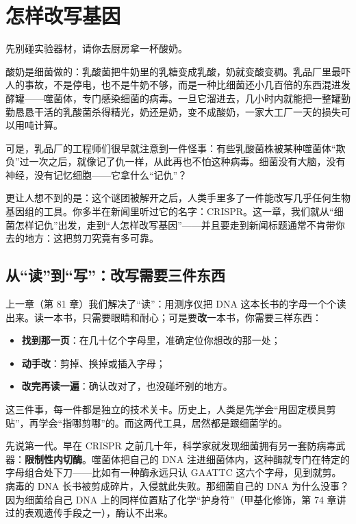 \chapter{怎样改写基因}

\begin{kaichang}
先别碰实验器材，请你去厨房拿一杯酸奶。

酸奶是细菌做的：乳酸菌把牛奶里的乳糖变成乳酸，奶就变酸变稠。乳品厂里最吓人的事故，不是停电，也不是牛奶不够，而是一种比细菌还小几百倍的东西混进发酵罐——噬菌体，专门感染细菌的病毒。一旦它溜进去，几小时内就能把一整罐勤勤恳恳干活的乳酸菌杀得精光，奶还是奶，变不成酸奶，一家大工厂一天的损失可以用吨计算。

可是，乳品厂的工程师们很早就注意到一件怪事：有些乳酸菌株被某种噬菌体“欺负”过一次之后，就像记了仇一样，从此再也不怕这种病毒。细菌没有大脑，没有神经，没有记忆细胞——它拿什么“记仇”？

更让人想不到的是：这个谜团被解开之后，人类手里多了一件能改写几乎任何生物基因组的工具。你多半在新闻里听过它的名字：CRISPR。这一章，我们就从“细菌怎样记仇”出发，走到“人怎样改写基因”——并且要走到新闻标题通常不肯带你去的地方：这把剪刀究竟有多可靠。
\end{kaichang}

\section{从“读”到“写”：改写需要三件东西}

上一章（第 81 章）我们解决了“读”：用测序仪把 DNA 这本长书的字母一个个读出来。读一本书，只需要眼睛和耐心；可是要\textbf{改}一本书，你需要三样东西：

\begin{itemize}[itemsep=2pt]
\item \textbf{找到那一页}：在几十亿个字母里，准确定位你想改的那一处；
\item \textbf{动手改}：剪掉、换掉或插入字母；
\item \textbf{改完再读一遍}：确认改对了，也没碰坏别的地方。
\end{itemize}

这三件事，每一件都是独立的技术关卡。历史上，人类是先学会“用固定模具剪贴”，再学会“指哪剪哪”的。而这两代工具，居然都是跟细菌学的。

先说第一代。早在 CRISPR 之前几十年，科学家就发现细菌拥有另一套防病毒武器：\textbf{限制性内切酶}。噬菌体把自己的 DNA 注进细菌体内，这种酶就专门在特定的字母组合处下刀——比如有一种酶永远只认 GAATTC 这六个字母，见到就剪。病毒的 DNA 长书被剪成碎片，入侵就此失败。那细菌自己的 DNA 为什么没事？因为细菌给自己 DNA 上的同样位置贴了化学“护身符”（甲基化修饰，第 74 章讲过的表观遗传手段之一），酶认不出来。

